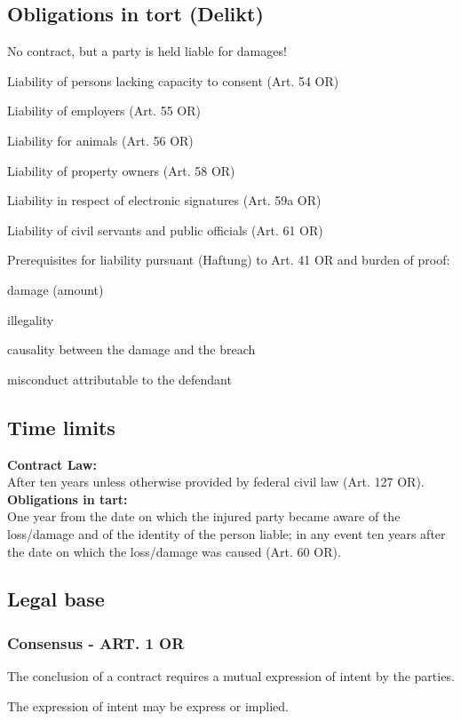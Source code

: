 \subsection{Obligations in tort (Delikt)}
No contract, but a party is held liable for damages!
\begin{compactitem}
	\item Liability of persons lacking capacity to consent (Art. 54 OR)
	\item Liability of employers (Art. 55 OR)
	\item Liability for animals (Art. 56 OR)
	\item Liability of property owners (Art. 58 OR)
	\item Liability in respect of electronic signatures (Art. 59a OR)
	\item Liability of civil servants and public officials (Art. 61 OR)
\end{compactitem}
Prerequisites for liability pursuant (Haftung) to Art. 41 OR and burden of proof:
\begin{compactitem}
	\item damage (amount)
	\item illegality
	\item causality between the damage and the breach
	\item misconduct attributable to the defendant
\end{compactitem}

\subsection{Time limits}
\textbf{Contract Law:}\\
After ten years unless otherwise provided by federal civil law (Art. 127 OR).\\
\textbf{Obligations in tart:}\\
One year from the date on which the injured party became aware of the loss/damage and of the identity of the person liable; in any event ten years after the date on which the loss/damage was caused (Art. 60 OR).

\subsection{Legal base}
\subsubsection{Consensus - ART. 1 OR}
\begin{compactenum}
	\item The conclusion of a contract requires a mutual expression of intent by the parties.
	\item The expression of intent may be express or implied.
\end{compactenum}

